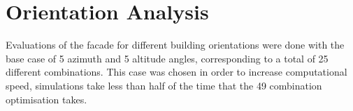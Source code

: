 \section{Orientation Analysis}

	Evaluations of the facade for different building orientations were done with the base case of 5 azimuth and 5 altitude angles, corresponding to a total of 25 different combinations. This case was chosen in order to increase computational speed, simulations take less than half of the time that the 49 combination optimisation takes. 

